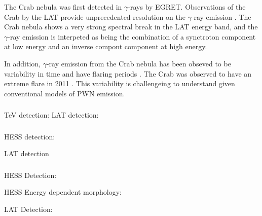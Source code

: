 The Crab nebula was first detected in $\gamma$-rays by \ac{EGRET}.
Observations of the Crab by the \ac{LAT} provide unprecedented resolution
on the $\gamma$-ray emission \cite{abdo_2010a_fermi-large}.  The Crab
nebula shows a very strong spectral break in the \ac{LAT} energy band,
and the $\gamma$-ray emission is interpeted as being the combination of
a synctroton component at low energy and an inverse compont component
at high energy.

In addition, $\gamma$-ray emission from the Crab nebula has
been obseved to be variability in time and have flaring periods
\citep{abdo_2011a_gamma-ray-flares}.  The Crab was observed to have
an extreme flare in 2011 \citep{buehler_2012a_gamma-ray-activity}.
This variability is challengeing to understand given conventional models
of \ac{PWN} emission.

\subsubsection{\velax}


\velax

TeV detection: \cite{aharonian_2006a_first-detection}
LAT detection: \cite{abdo_2010c_fermi-large}

\subsubsection{\mshfifteenfiftytwo}


HESS detection: \cite{aharonian_2005a_discovery-extended}

LAT detection \cite{abdo_2010a_detection-energetic}

\subsubsection{}


HESS Detection: \cite{aharonian_2006a_h.e.s.s.-survey}

HESS Energy dependent morphology: \cite{aharonian_2006a_energy-dependent}

LAT Detection: \cite{grondin_2011a_detection-pulsar}

\subsubsection{}

